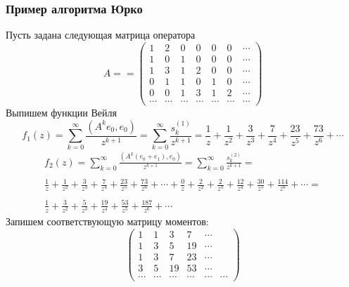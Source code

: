 \subsubsection{Пример алгоритма Юрко}
Пусть задана следующая матрица оператора
$$%
A=
=\left(
\begin{array} {ccccccc}
1 & 2 & 0 & 0 & 0 & 0 & \cdots \\
1 & 0 & 1 & 0 & 0 & 0 & \cdots \\
1 & 3 & 1 & 2 & 0 & 0 & \cdots \\
0 & 1 & 1 & 0 & 1 & 0 & \cdots \\
0 & 0 & 1 & 3 & 1 & 2 & \cdots \\
\cdots & \cdots & \cdots & \cdots & \cdots & \cdots & \cdots
\end{array}
\right)
$$%
Выпишем функции Вейля
$$%
f_1(z)=\sum^{\infty}_{k=0}{\frac{(A^ke_0,e_0)}{z^{k+1}}}=\sum^{\infty}_{k=0}
{\frac{s^{(1)}_k}{z^{k+1}}}=
\frac{1}{z}+\frac{1}{z^2}+\frac{3}{z^3}+\frac{7}{z^4}+\frac{23}{z^5}+\frac{73}{z^6}+\cdots
$$%
$$%
\begin{array}{lllllllll}
f_2(z)=\displaystyle\sum^{\infty}_{k=0}{\displaystyle\frac{(A^k(e_0+e_1),e_0)}{z^{k+1}}}=\displaystyle\sum^{\infty}_{k=0}{\displaystyle\frac{s^{(2)}_k}{z^{k+1}}}= \\ \\
\displaystyle\frac{1}{z}+\frac{1}{z^2}+\frac{3}{z^3}+\frac{7}{z^4}+\frac{23}{z^5}+\frac{73}{z^6}+\cdots+
\frac{0}{z}+\frac{2}{z^2}+\frac{2}{z^3}+\frac{12}{z^4}+\frac{30}{z^5}+\frac{114}{z^6}+\cdots= \\ \\
\displaystyle\frac{1}{z}+\frac{3}{z^2}+\frac{5}{z^3}+\frac{19}{z^4}+\frac{53}{z^5}+\frac{187}{z^6}+\cdots
\end{array}
$$%
Запишем соответствующую матрицу моментов:
$$%
\left(
\begin{array} {cccccccccc}
1 & 1 & 3 & 7 &  \cdots \\
1 & 3 & 5 & 19     & \cdots \\
1 & 3 & 7 & 23     & \cdots \\
3 & 5 & 19 & 53   & \cdots \\
\cdots & \cdots & \cdots & \cdots & \cdots & \cdots
\end{array}
\right)
$$%

